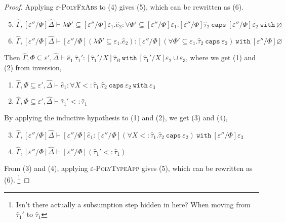 \documentclass{llncs}
\newcommand{\keywadj}[1]{\mathtt{#1}}
\newcommand{\keyw}[1]{\keywadj{#1}~}
\newcommand{\kw}[1]{\keyw{ #1 }}
\begin{document}
\begin{proof}
Applying \textsc{$\varepsilon$-PolyFxAbs} to (4) gives (5), which can be rewritten as (6).

\begin{enumerate}
	\setcounter{enumi}{4}
	\item $\hat \Gamma, [\varepsilon''/\Phi]\hat \Delta \vdash \lambda \Phi' \subseteq [\varepsilon''/\Phi]\varepsilon_1.\hat e_2: \forall \Phi' \subseteq [\varepsilon''/\Phi]\varepsilon_1. [\varepsilon''/\Phi]\hat \tau_2~\kw{caps} [\varepsilon''/\Phi]\varepsilon_2~\kw{with} \varnothing$
	\item $\hat \Gamma, [\varepsilon''/\Phi]\hat \Delta \vdash [\varepsilon''/\Phi](\lambda \Phi' \subseteq \varepsilon_1. \hat e_2): [\varepsilon''/\Phi](\forall \Phi' \subseteq \varepsilon_1. \hat \tau_2~\kw{caps} \varepsilon_2)~\kw{with} [\varepsilon''/\Phi]\varnothing$
\end{enumerate}

 Then $\hat \Gamma, \Phi \subseteq \varepsilon', \hat \Delta \vdash \hat e_1~\hat \tau_1': [\hat \tau_1'/X]\hat \tau_B~\kw{with} [\hat \tau_1'/X]\varepsilon_2 \cup \varepsilon_3$, where we get (1) and (2) from inversion,

\begin{enumerate}
	\item $\hat \Gamma, \Phi \subseteq \varepsilon', \hat \Delta \vdash \hat e_1: \forall X <: \hat \tau_1. \hat \tau_2~\kw{caps} \varepsilon_2~\kw{with} \varepsilon_3$
	\item $\hat \Gamma, \Phi \subseteq \varepsilon', \hat \Delta \vdash \hat \tau_1' <: \hat \tau_1$
\end{enumerate}

By applying the inductive hypothesis to (1) and (2), we get (3) and (4),

\begin{enumerate}
	\setcounter{enumi}{2}
	\item $\hat \Gamma, [\varepsilon''/\Phi]\hat \Delta \vdash [\varepsilon''/\Phi]\hat e_1: [\varepsilon''/\Phi](\forall X <: \hat \tau_1.\hat \tau_2~\kw{caps} \varepsilon_2)~\kw{with} [\varepsilon''/\Phi]\varepsilon_3$
	\item $\hat \Gamma, [\varepsilon''/\Phi]\hat \Delta \vdash [\varepsilon''/\Phi](\hat \tau_1' <: \hat \tau_1)$
\end{enumerate}

From (3) and (4), applying \textsc{$\varepsilon$-PolyTypeApp} gives (5), which can be rewritten as (6). \footnote{Isn't there actually a subsumption step hidden in here? When moving from $\hat \tau_1'$ to $\hat \tau_1$}


\end{proof}
\end{document}
